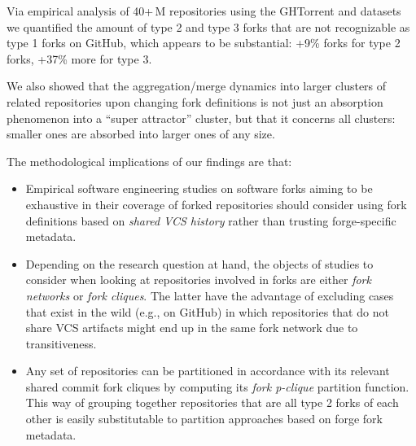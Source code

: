 Via empirical analysis of 40+\,M repositories using the GHTorrent and \SWH{}
datasets we quantified the amount of type 2 and type 3 forks that are not
recognizable as type 1 forks on GitHub, which appears to be substantial: +9\%
forks for type 2 forks, +37\% more for type 3.

We also showed that the aggregation/merge dynamics into larger clusters of
related repositories upon changing fork definitions is not just an absorption
phenomenon into a ``super attractor'' cluster, but that it concerns all
clusters: smaller ones are absorbed into larger ones of any size.

The methodological implications of our findings are that:
\begin{itemize}

\item Empirical software engineering studies on software forks aiming to be
  exhaustive in their coverage of forked repositories should consider using
  fork definitions based on \emph{shared \gls{VCS} history} rather than
  trusting forge-specific metadata.

\item Depending on the research question at hand, the objects of studies to
  consider when looking at repositories involved in forks are either \emph{fork
    networks} or \emph{fork cliques}. The latter have the advantage of
  excluding cases that exist in the wild (e.g., on GitHub) in which
  repositories that do not share \gls{VCS} artifacts might end up in the same
  fork network due to transitiveness.

\item Any set of repositories can be partitioned in accordance with its
  relevant shared commit fork cliques by computing its \emph{fork p-clique}
  partition function. This way of grouping together repositories that are all
  type 2 forks of each other is easily substitutable to partition approaches
  based on forge fork metadata.

\end{itemize}
